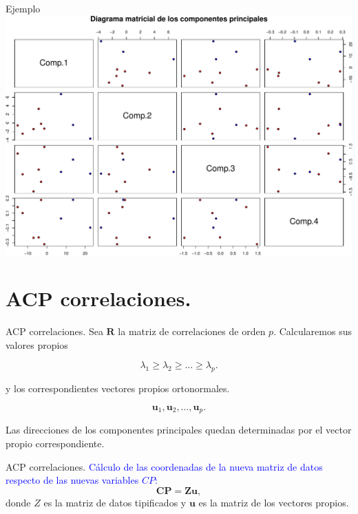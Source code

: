 \documentclass[
  ignorenonframetext,
]{beamer}
\newcommand\blue[1]{\textcolor{blue}{#1}}
\begin{document}
\begin{frame}{Ejemplo}
\protect\hypertarget{ejemplo-10}{}
\includegraphics{AnalisisComponentesPrincipales_fusion_files/figure-beamer/pairsacptodos1-1.pdf}
\end{frame}

\hypertarget{acp-correlaciones.}{%
\section{ACP correlaciones.}\label{acp-correlaciones.}}

\begin{frame}{ACP correlaciones.}
\protect\hypertarget{acp-correlaciones.-1}{}
Sea \(\mathbf{R}\) la matriz de correlaciones de orden \(p\).
Calcularemos sus valores propios

\[\lambda_1\geq \lambda_2\geq\ldots\geq\lambda_p.\]

y los correspondientes vectores propios ortonormales.

\[\mathbf{u}_1,\mathbf{u}_2,\ldots,\mathbf{u}_p.\]

Las direcciones de los componentes principales quedan determinadas por
el vector propio correspondiente.
\end{frame}

\begin{frame}{ACP correlaciones.}
\protect\hypertarget{acp-correlaciones.-2}{}
\blue{Cálculo de las coordenadas de la nueva matriz de datos respecto de las
nuevas variables $CP$:} \[\mathbf{CP}= \mathbf{Z} \mathbf{u},\] donde
\(Z\) es la matriz de datos tipificados y \(\mathbf{u}\) es la matriz de
los vectores propios.
\end{frame}
\end{document}
